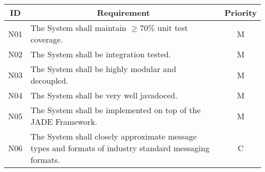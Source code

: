 \begin{table}[htbp]
\begin{center}
\begin{longtable}{c p{4.2in} c }

\multicolumn{1}{c}{\textbf{ID}}           &
\multicolumn{1}{c}{\textbf{Requirement}}  &
\multicolumn{1}{c}{\textbf{Priority}}     \\        
\toprule

N01  & The System shall maintain $\geq70\%$ unit test coverage.    & M \\
N02  & The System shall be integration tested.                     & M \\
N03  & The System shall be highly modular and decoupled.           & M \\
N04  & The System shall be very well javadoced.                    & M \\
N05  & The System shall be implemented on top of the JADE Framework.   & M \\
N06  & The System shall closely approximate message types and formats of industry standard messaging formats. & C \\
 
\end{longtable}
\end{center}
\end{table}

